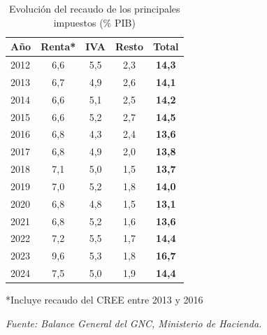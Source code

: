 \begin{table}
\centering
\caption{Evolución del recaudo de los principales impuestos (\% PIB)}
\label{tab:intaggtax}
\begin{tabular}{|l|c|c|c|c|}
\hline
\textbf{Año} & \textbf{Renta*} & \textbf{IVA} & \textbf{Resto} & \textbf{Total} \\
\hline
2012 & 6,6 & 5,5 & 2,3 & \textbf{14,3} \\
2013 & 6,7 & 4,9 & 2,6 & \textbf{14,1} \\
2014 & 6,6 & 5,1 & 2,5 & \textbf{14,2} \\
2015 & 6,6 & 5,2 & 2,7 & \textbf{14,5} \\
2016 & 6,8 & 4,3 & 2,4 & \textbf{13,6} \\
2017 & 6,8 & 4,9 & 2,0 & \textbf{13,8} \\
2018 & 7,1 & 5,0 & 1,5 & \textbf{13,7} \\
2019 & 7,0 & 5,2 & 1,8 & \textbf{14,0} \\
2020 & 6,8 & 4,8 & 1,5 & \textbf{13,1} \\
2021 & 6,8 & 5,2 & 1,6 & \textbf{13,6} \\
2022 & 7,2 & 5,5 & 1,7 & \textbf{14,4} \\
2023 & 9,6 & 5,3 & 1,8 & \textbf{16,7} \\
2024 & 7,5 & 5,0 & 1,9 & \textbf{14,4} \\
\hline
\end{tabular}
\vspace{0.1cm}
\par\footnotesize{*Incluye recaudo del CREE entre 2013 y 2016}
\vspace{0.1cm}
\par\footnotesize{\textit{Fuente: Balance General del GNC, Ministerio de Hacienda.}}
\end{table}

